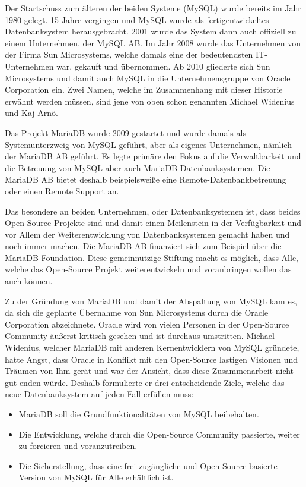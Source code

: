 
Der Startschuss zum älteren der beiden Systeme (MySQL) wurde bereits im Jahr 1980 gelegt. 15 Jahre vergingen und MySQL wurde als fertigentwickeltes Datenbanksystem herausgebracht. 2001 wurde das System dann auch offiziell zu einem Unternehmen, der MySQL AB. Im Jahr 2008 wurde das Unternehmen von der Firma Sun Microsystems, welche damals eine der bedeutendsten IT-Unternehmen war, gekauft und übernommen. Ab 2010 gliederte sich Sun Microsystems und damit auch MySQL in die Unternehmensgruppe von Oracle Corporation ein. Zwei Namen, welche im Zusammenhang mit dieser Historie erwähnt werden müssen, sind jene von oben schon genannten Michael Widenius und Kaj Arnö. \cite{MariaMy}

Das Projekt MariaDB wurde 2009 gestartet und wurde damals als Systemunterzweig von MySQL geführt, aber als eigenes Unternehmen, nämlich der MariaDB AB geführt. Es legte primäre den Fokus auf die Verwaltbarkeit und die Betreuung von MySQL aber auch MariaDB Datenbanksystemen. Die MariaDB AB bietet deshalb beispielsweiße eine Remote-Datenbankbetreuung oder einen Remote Support an. \cite{MariaMy}

Das besondere an beiden Unternehmen, oder Datenbanksystemen ist, dass beides Open-Source Projekte sind und damit einen Meilenstein in der Verfügbarkeit und vor Allem der Weiterentwicklung von Datenbanksystemen gemacht haben und noch immer machen. Die MariaDB AB finanziert sich zum Beispiel über die MariaDB Foundation. Diese gemeinnützige Stiftung macht es möglich, dass Alle, welche das Open-Source Projekt weiterentwickeln und voranbringen wollen das auch können. \cite{MariaMy}

Zu der Gründung von MariaDB und damit der Abspaltung von MySQL kam es, da sich die geplante Übernahme von Sun Microsystems durch die Oracle Corporation abzeichnete. Oracle wird von vielen Personen in der Open-Source Community äußerst kritisch gesehen und ist durchaus umstritten. Michael Widenius, welcher MariaDB mit anderen Kernentwicklern von MySQL gründete, hatte Angst, dass Oracle in Konflikt mit den Open-Source lastigen Visionen und Träumen von Ihm gerät und war der Ansicht, dass diese Zusammenarbeit nicht gut enden würde. Deshalb formulierte er drei entscheidende Ziele, welche das neue Datenbanksystem auf jeden Fall erfüllen muss: \cite{MariaMy}

\begin{itemize}
    \item MariaDB soll die Grundfunktionalitäten von MySQL beibehalten.
    \item Die Entwicklung, welche durch die Open-Source Community passierte, weiter zu forcieren und voranzutreiben.
    \item Die Sicherstellung, dass eine frei zugängliche und Open-Source basierte Version von MySQL für Alle erhältlich ist.
\end{itemize}

\cite{MariaMy}
